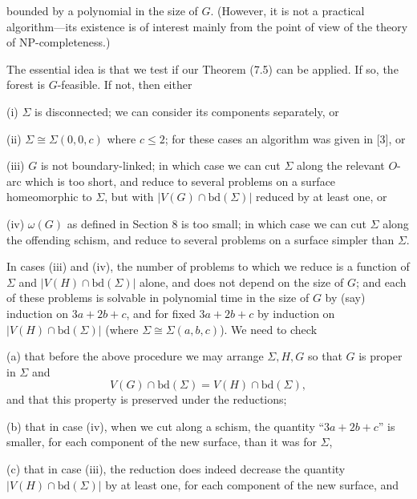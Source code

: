 \noindent bounded by a polynomial in the size of $G$. (However, it is not a practical algorithm---its existence is of interest mainly from the point of view of the theory of NP-completeness.)

The essential idea is that we test if our Theorem (7.5) can be applied. If so, the forest is $G$-feasible. If not, then either

\hspace*{12pt}(i) $\Sigma$ is disconnected; we can consider its components separately, or

\hspace*{12pt}(ii) $\Sigma \cong \Sigma(0, 0, c)$ where $c \le 2$; for these cases an algorithm was given in [3], or

\hspace*{12pt}(iii) $G$ is not boundary-linked; in which case we can cut $\Sigma$ along the relevant $O$-arc which is too short, and reduce to several problems on a surface homeomorphic to $\Sigma$, but with $|V(G) \cap \mathrm{bd}(\Sigma)|$ reduced by at least one, or

\hspace*{12pt}(iv) $\omega(G)$ as defined in Section 8 is too small; in which case we can cut $\Sigma$ along the offending schism, and reduce to several problems on a surface simpler than $\Sigma$.

In cases (iii) and (iv), the number of problems to which we reduce is a function of $\Sigma$ and $|V(H) \cap \mathrm{bd}(\Sigma)|$ alone, and does not depend on the size of $G$; and each of these problems is solvable in polynomial time in the size of $G$ by (say) induction on $3a + 2b + c$, and for fixed $3a + 2b + c$ by induction on $|V(H) \cap \mathrm{bd}(\Sigma)|$ (where $\Sigma \cong \Sigma(a, b, c)$). We need to check

\hspace*{12pt}(a) that before the above procedure we may arrange $\Sigma, H, G$ so that $G$ is proper in $\Sigma$ and
\begin{equation*}
V(G) \cap \mathrm{bd}(\Sigma) = V(H) \cap \mathrm{bd}(\Sigma),
\end{equation*}
and that this property is preserved under the reductions;

\hspace*{12pt}(b) that in case (iv), when we cut along a schism, the quantity ``$3a + 2b + c$'' is smaller, for each component of the new surface, than it was for $\Sigma$,

\hspace*{12pt}(c) that in case (iii), the reduction does indeed decrease the quantity $|V(H) \cap \mathrm{bd}(\Sigma)|$ by at least one, for each component of the new surface, and

